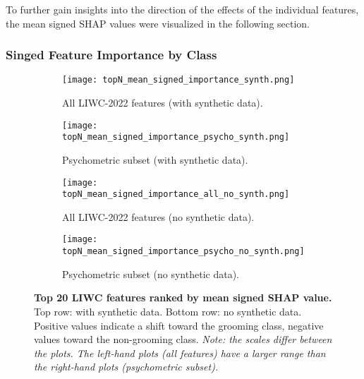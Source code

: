 To further gain insights into the direction of the effects of the individual features, the mean signed SHAP values were visualized in the following section.


\subsubsection{Singed Feature Importance by Class}

\begin{figure}[H]
  \centering
  
  \begin{subfigure}[t]{0.49\textwidth}
    \centering
    \texttt{[image: topN\_mean\_signed\_importance\_synth.png]}
    \caption{All LIWC-2022 features (with synthetic data).}
    \label{fig:synth_all_shap}
  \end{subfigure}\hfill
  \begin{subfigure}[t]{0.49\textwidth}
    \centering
    \texttt{[image: topN\_mean\_signed\_importance\_psycho\_synth.png]}
    \caption{Psychometric subset (with synthetic data).}
    \label{fig:synth_psycho_shap}
  \end{subfigure}
  
  \vspace{0.5cm}
  
  \begin{subfigure}[t]{0.49\textwidth}
    \centering
    \texttt{[image: topN\_mean\_signed\_importance\_all\_no\_synth.png]}
    \caption{All LIWC-2022 features (no synthetic data).}
    \label{fig:no_synth_all_shap}
  \end{subfigure}\hfill
  \begin{subfigure}[t]{0.49\textwidth}
    \centering
    \texttt{[image: topN\_mean\_signed\_importance\_psycho\_no\_synth.png]}
    \caption{Psychometric subset (no synthetic data).}
    \label{fig:no_synth_psycho_shap}
  \end{subfigure}

  \caption[Top 20 LIWC features ranked by mean signed SHAP value.]{\textbf{Top 20 LIWC features ranked by mean signed SHAP value.} 
  Top row: with synthetic data. Bottom row: no synthetic data. 
  Positive values indicate a shift toward the grooming class, negative values toward the non-grooming class. 
  \textit{Note: the scales differ between the plots. The left-hand plots (all features) have a larger range than the right-hand plots (psychometric subset).}}
  \label{fig:feature_importance_by_class_combined}
\end{figure}

